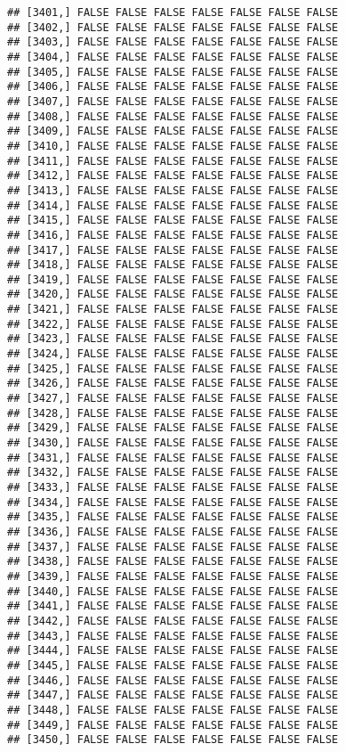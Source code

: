 \documentclass[
]{article}
\begin{document}
\begin{verbatim}
## [3401,] FALSE FALSE FALSE FALSE FALSE FALSE FALSE
## [3402,] FALSE FALSE FALSE FALSE FALSE FALSE FALSE
## [3403,] FALSE FALSE FALSE FALSE FALSE FALSE FALSE
## [3404,] FALSE FALSE FALSE FALSE FALSE FALSE FALSE
## [3405,] FALSE FALSE FALSE FALSE FALSE FALSE FALSE
## [3406,] FALSE FALSE FALSE FALSE FALSE FALSE FALSE
## [3407,] FALSE FALSE FALSE FALSE FALSE FALSE FALSE
## [3408,] FALSE FALSE FALSE FALSE FALSE FALSE FALSE
## [3409,] FALSE FALSE FALSE FALSE FALSE FALSE FALSE
## [3410,] FALSE FALSE FALSE FALSE FALSE FALSE FALSE
## [3411,] FALSE FALSE FALSE FALSE FALSE FALSE FALSE
## [3412,] FALSE FALSE FALSE FALSE FALSE FALSE FALSE
## [3413,] FALSE FALSE FALSE FALSE FALSE FALSE FALSE
## [3414,] FALSE FALSE FALSE FALSE FALSE FALSE FALSE
## [3415,] FALSE FALSE FALSE FALSE FALSE FALSE FALSE
## [3416,] FALSE FALSE FALSE FALSE FALSE FALSE FALSE
## [3417,] FALSE FALSE FALSE FALSE FALSE FALSE FALSE
## [3418,] FALSE FALSE FALSE FALSE FALSE FALSE FALSE
## [3419,] FALSE FALSE FALSE FALSE FALSE FALSE FALSE
## [3420,] FALSE FALSE FALSE FALSE FALSE FALSE FALSE
## [3421,] FALSE FALSE FALSE FALSE FALSE FALSE FALSE
## [3422,] FALSE FALSE FALSE FALSE FALSE FALSE FALSE
## [3423,] FALSE FALSE FALSE FALSE FALSE FALSE FALSE
## [3424,] FALSE FALSE FALSE FALSE FALSE FALSE FALSE
## [3425,] FALSE FALSE FALSE FALSE FALSE FALSE FALSE
## [3426,] FALSE FALSE FALSE FALSE FALSE FALSE FALSE
## [3427,] FALSE FALSE FALSE FALSE FALSE FALSE FALSE
## [3428,] FALSE FALSE FALSE FALSE FALSE FALSE FALSE
## [3429,] FALSE FALSE FALSE FALSE FALSE FALSE FALSE
## [3430,] FALSE FALSE FALSE FALSE FALSE FALSE FALSE
## [3431,] FALSE FALSE FALSE FALSE FALSE FALSE FALSE
## [3432,] FALSE FALSE FALSE FALSE FALSE FALSE FALSE
## [3433,] FALSE FALSE FALSE FALSE FALSE FALSE FALSE
## [3434,] FALSE FALSE FALSE FALSE FALSE FALSE FALSE
## [3435,] FALSE FALSE FALSE FALSE FALSE FALSE FALSE
## [3436,] FALSE FALSE FALSE FALSE FALSE FALSE FALSE
## [3437,] FALSE FALSE FALSE FALSE FALSE FALSE FALSE
## [3438,] FALSE FALSE FALSE FALSE FALSE FALSE FALSE
## [3439,] FALSE FALSE FALSE FALSE FALSE FALSE FALSE
## [3440,] FALSE FALSE FALSE FALSE FALSE FALSE FALSE
## [3441,] FALSE FALSE FALSE FALSE FALSE FALSE FALSE
## [3442,] FALSE FALSE FALSE FALSE FALSE FALSE FALSE
## [3443,] FALSE FALSE FALSE FALSE FALSE FALSE FALSE
## [3444,] FALSE FALSE FALSE FALSE FALSE FALSE FALSE
## [3445,] FALSE FALSE FALSE FALSE FALSE FALSE FALSE
## [3446,] FALSE FALSE FALSE FALSE FALSE FALSE FALSE
## [3447,] FALSE FALSE FALSE FALSE FALSE FALSE FALSE
## [3448,] FALSE FALSE FALSE FALSE FALSE FALSE FALSE
## [3449,] FALSE FALSE FALSE FALSE FALSE FALSE FALSE
## [3450,] FALSE FALSE FALSE FALSE FALSE FALSE FALSE

\end{verbatim}
\end{document}
